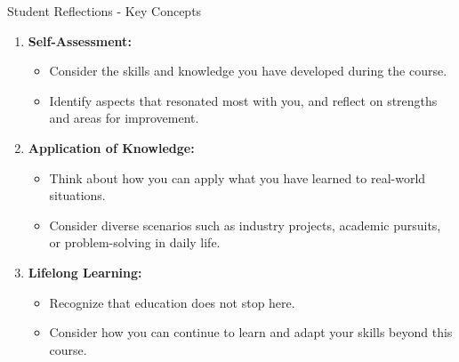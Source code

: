 \documentclass[aspectratio=169]{beamer}
\begin{document}
\begin{frame}[fragile]{Student Reflections - Key Concepts}
    \begin{enumerate}
        \item \textbf{Self-Assessment:}
            \begin{itemize}
                \item Consider the skills and knowledge you have developed during the course. 
                \item Identify aspects that resonated most with you, and reflect on strengths and areas for improvement.
            \end{itemize}
        
        \item \textbf{Application of Knowledge:}
            \begin{itemize}
                \item Think about how you can apply what you have learned to real-world situations. 
                \item Consider diverse scenarios such as industry projects, academic pursuits, or problem-solving in daily life.
            \end{itemize}
        
        \item \textbf{Lifelong Learning:}
            \begin{itemize}
                \item Recognize that education does not stop here. 
                \item Consider how you can continue to learn and adapt your skills beyond this course.
            \end{itemize}
    \end{enumerate}
\end{frame}
\end{document}
